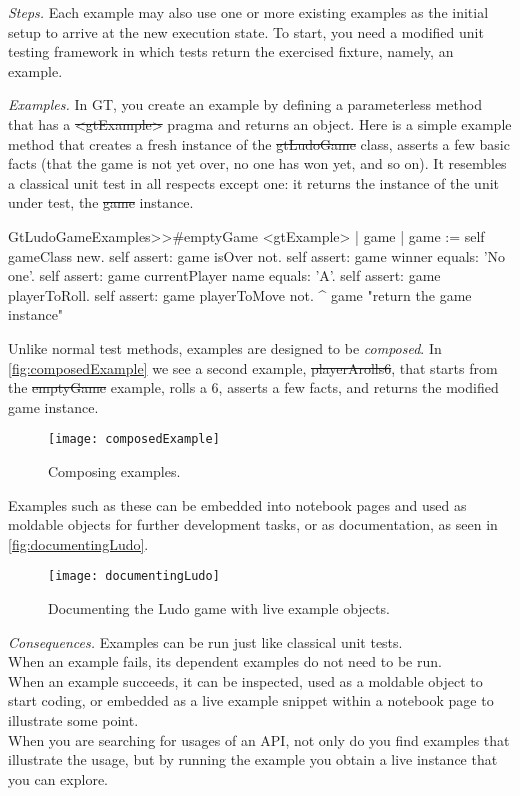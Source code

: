 \documentclass[acmsmall,screen,authorversion,nonacm]{acmart} %
\newcommand\dd[1]{\nbe{Daniel}{#1}{magenta}} %
\newcommand{\patsec}[1]{\noindent\textit{#1.}\xspace}
\begin{document}
\patsec{Steps}
Each example may also use one or more existing examples as the initial setup to arrive at the new execution state.
To start, you need a modified unit testing framework in which tests return the exercised fixture, namely, an example.

\patsec{Examples}
In GT, you create an example by defining a parameterless method that has a \st{<gtExample>} pragma and returns an object.
Here is a simple example method that creates a fresh instance of the \st{gtLudoGame} class, asserts a few basic facts (\ie that the game is not yet over, no one has won yet, and so on).
It resembles a classical unit test in all respects except one: it returns the instance of the unit under test, \ie the \st{game} instance.


\begin{code}
GtLudoGameExamples>>#emptyGame
	<gtExample>
	| game |
	game := self gameClass new.
	self assert: game isOver not.
	self assert: game winner equals: 'No one'.
	self assert: game currentPlayer name equals: 'A'.
	self assert: game playerToRoll.
	self assert: game playerToMove not.
	^ game  "return the game instance"
\end{code}

Unlike normal test methods, examples are designed to be \emph{composed}.
In \autoref{fig:composedExample} we see a second example, \st{playerArolls6}, that starts from the \st{emptyGame} example, rolls a $6$, asserts a few facts, and returns the modified game instance.

\begin{figure}[h]
  \texttt{[image: composedExample]}
  \caption{Composing examples.}
  \label{fig:composedExample}
\end{figure}

Examples such as these can be embedded into notebook pages and used as moldable objects for further development tasks, or as documentation, as seen in \autoref{fig:documentingLudo}.

\begin{figure}[h]
  \texttt{[image: documentingLudo]}
  \caption{Documenting the Ludo game with live example objects.}
  \label{fig:documentingLudo}
\end{figure}

    
\patsec{Consequences}
Examples can be run just like classical unit tests.\\
When an example fails, its dependent examples do not need to be run.\\
When an example succeeds, it can be inspected, used as a moldable object to start coding, or embedded as a live example snippet within a notebook page to illustrate some point.\\
When you are searching for usages of an API, not only do you find examples that illustrate the usage, but by running the example you obtain a live instance that you can explore.
\end{document}
